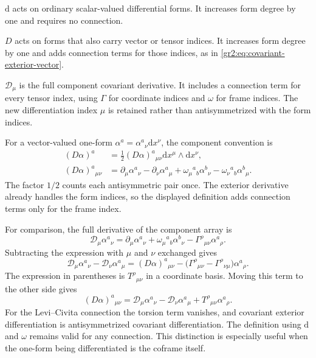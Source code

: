 \documentclass[11pt,a4paper]{article}
\numberwithin{equation}{section}
\newcommand{\dd}{\mathrm d}
\begin{document}
\begin{remarkbox}
\(\dd\) acts on ordinary scalar-valued differential forms. It increases
form degree by one and requires no connection.

\(D\) acts on forms that also carry vector or tensor indices. It
increases form degree by one and adds connection terms for those
indices, as in \eqref{gr2:eq:covariant-exterior-vector}.

\(\mathcal D_\mu\) is the full component covariant derivative.
It includes a connection term for every tensor index, using
\(\Gamma\) for coordinate indices and \(\omega\) for frame indices.
The new differentiation index \(\mu\) is retained rather than
antisymmetrized with the form indices.
\end{remarkbox}

For a vector-valued one-form \(\alpha^a=\alpha^a{}_\nu\dd x^\nu\),
the component convention is
\begin{align}
 (D\alpha)^a&=\frac12(D\alpha)^a{}_{\mu\nu}
                     \dd x^\mu\wedge\dd x^\nu,\\
 (D\alpha)^a{}_{\mu\nu}
 &=\partial_\mu\alpha^a{}_\nu-\partial_\nu\alpha^a{}_\mu
 +\omega_\mu{}^a{}_b\alpha^b{}_\nu
 -\omega_\nu{}^a{}_b\alpha^b{}_\mu.
 \label{gr2:eq:covariant-exterior-components}
\end{align}
The factor \(1/2\) counts each antisymmetric pair once. The exterior
derivative already handles the form indices, so the displayed
definition adds connection terms only for the frame index.

For comparison, the full derivative of the component array is
\[
 \mathcal D_\mu\alpha^a{}_\nu
 =\partial_\mu\alpha^a{}_\nu
 +\omega_\mu{}^a{}_b\alpha^b{}_\nu
 -\Gamma^\rho{}_{\mu\nu}\alpha^a{}_\rho.
\]
Subtracting the expression with \(\mu\) and \(\nu\) exchanged gives
\[
 \mathcal D_\mu\alpha^a{}_\nu-\mathcal D_\nu\alpha^a{}_\mu
 =(D\alpha)^a{}_{\mu\nu}
 -\bigl(\Gamma^\rho{}_{\mu\nu}-\Gamma^\rho{}_{\nu\mu}\bigr)
   \alpha^a{}_\rho.
\]
The expression in parentheses is \(T^\rho{}_{\mu\nu}\) in a coordinate
basis.
Moving this term to the other side gives
\[
 (D\alpha)^a{}_{\mu\nu}
 =\mathcal D_\mu\alpha^a{}_\nu
  -\mathcal D_\nu\alpha^a{}_\mu
  +T^\rho{}_{\mu\nu}\alpha^a{}_\rho.
\]
For the Levi--Civita connection the torsion term vanishes, and
covariant exterior differentiation is antisymmetrized covariant
differentiation. The definition using \(\dd\) and \(\omega\) remains
valid for any connection. This distinction is especially useful when
the one-form being differentiated is the coframe itself.
\end{document}
